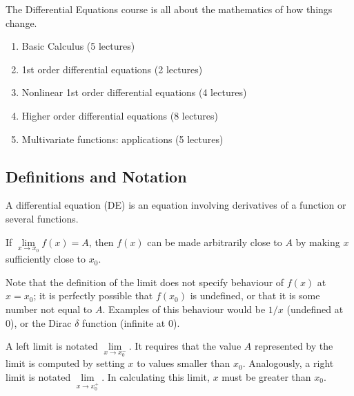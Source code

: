 
The Differential Equations course is all about the mathematics of how things change.

\begin{enumerate}
	\item Basic Calculus (5 lectures)
	\item 1st order differential equations (2 lectures)
	\item Nonlinear 1st order differential equations (4 lectures)
	\item Higher order differential equations (8 lectures)
	\item Multivariate functions: applications (5 lectures)
\end{enumerate}

\subsection{Definitions and Notation}
\begin{definition}
	A differential equation (DE) is an equation involving derivatives of a function or several functions.
\end{definition}
\begin{definition}
	If $\lim\limits_{x \to x_0} f(x) = A$, then $f(x)$ can be made arbitrarily close to $A$ by making $x$ sufficiently close to $x_0$.
\end{definition}
Note that the definition of the limit does not specify behaviour of $f(x)$ at $x=x_0$; it is perfectly possible that $f(x_0)$ is undefined, or that it is some number not equal to $A$. Examples of this behaviour would be $1/x$ (undefined at 0), or the Dirac $\delta$ function (infinite at 0).

\begin{definition}
	A left limit is notated $\lim\limits_{x \to x_0^-}$. It requires that the value $A$ represented by the limit is computed by setting $x$ to values smaller than $x_0$.
	Analogously, a right limit is notated $\lim\limits_{x \to x_0^+}$. In calculating this limit, $x$ must be greater than $x_0$.
\end{definition}

